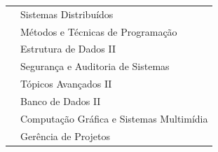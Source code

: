 \documentclass[11pt,fleqn]{book} %
\begin{document}
\begin{table}[]
{\begin{tabular}{@{}l|l@{}}
			\nameref{5_opt}                 & Sistemas Distribuídos                                                     \\
			\nameref{5_lab}                 & Métodos e Técnicas de Programação                                         \\ \midrule	
			\nameref{6_ia}                  & Estrutura de Dados II                                                     \\
			\nameref{6_seginfo}             & Segurança e Auditoria de Sistemas                                         \\
			\nameref{6_empdig}              & Tópicos Avançados II                                                      \\
			\nameref{6_datascience}         & Banco de Dados II                                                         \\
			\nameref{6_visstory}            & Computação Gráfica e Sistemas Multimídia                                  \\
			\nameref{6_govproj}             & Gerência de Projetos                                                       \\ \bottomrule
		\end{tabular}%
	}
\end{table}
\end{document}
